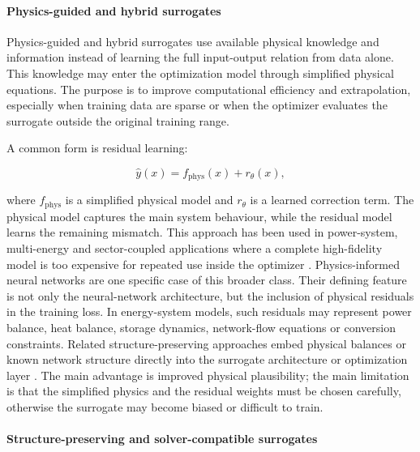\paragraph{Physics-guided and hybrid surrogates}

Physics-guided and hybrid surrogates use available physical knowledge
and information instead of learning the full input-output relation from
data alone. This knowledge may enter the optimization model through
simplified physical equations. The purpose is to improve computational
efficiency and extrapolation, especially when training data are sparse
or when the optimizer evaluates the surrogate outside the original
training range.

A common form is residual learning:

$$\begin{equation}
 \hat{y}(x) = f_{\mathrm{phys}}(x) + r_{\theta}(x),
\end{equation}$$

where $f_{\mathrm{phys}}$ is a simplified physical model and
$r_{\theta}$ is a learned correction term. The physical model captures
the main system behaviour, while the residual model learns the remaining
mismatch. This approach has been used in power-system, multi-energy and
sector-coupled applications where a complete high-fidelity model is too
expensive for repeated use inside the optimizer
\cite{Park2019,Liu20223726,Chen2023657,Liu20222679,Ren2024,Jalving2023,Zheng20231907}.
Physics-informed neural networks are one specific case of this broader
class. Their defining feature is not only the neural-network
architecture, but the inclusion of physical residuals in the training
loss. In energy-system models, such residuals may represent power
balance, heat balance, storage dynamics, network-flow equations or
conversion constraints. Related structure-preserving approaches embed
physical balances or known network structure directly into the
surrogate architecture or optimization layer
\cite{Park2019,Liu20223726,Chen2023657,Liu20242534}.
The main advantage is improved physical plausibility; the main
limitation is that the simplified physics and the residual weights must
be chosen carefully, otherwise the surrogate may become biased or
difficult to train.

\paragraph{Structure-preserving and solver-compatible surrogates}
\label{sec:tax:structured}

